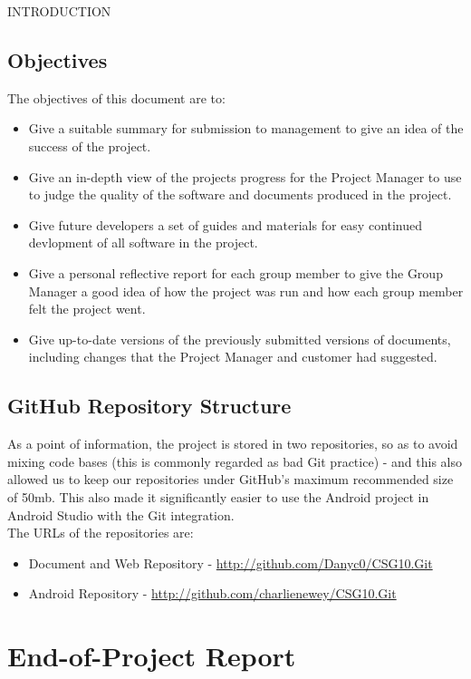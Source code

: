\documentclass{article}
\begin{document}
\begin{section}{INTRODUCTION}
		\subsection{Objectives}
		The objectives of this document are to:
		\begin{itemize}
			\item{Give a suitable summary for submission to management to give an idea of the success of the project.}
			\item{Give an in-depth view of the projects progress for the Project Manager to use to judge the quality of the software and documents produced in the project.}
			\item{Give future developers a set of guides and materials for easy continued devlopment of all software in the project.}
			\item{Give a personal reflective report for each group member to give the Group Manager a good idea of how the project was run and how each group member felt the project went.}
			\item{Give up-to-date versions of the previously submitted versions of documents, including changes that the Project Manager and customer had suggested.}
		\end{itemize}
	\end{section}
	
	\subsection{GitHub Repository Structure}
	As a point of information, the project is stored in two repositories, so as to avoid mixing code bases (this is commonly regarded as bad Git practice) - and this also allowed us to keep our repositories under GitHub's maximum recommended size of 50mb. This also made it significantly easier to use the Android project in Android Studio with the Git integration. \\
	
	The URLs of the repositories are:
	\begin{itemize}
		\item{Document and Web Repository - \url{http://github.com/Danyc0/CSG10.Git}}
		\item{Android Repository - \url{http://github.com/charlienewey/CSG10.Git}}
	\end{itemize}
	
	\clearpage
	\section{End-of-Project Report}
\end{document}
